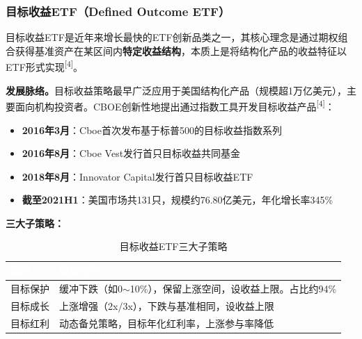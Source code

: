 \documentclass[10pt,a4paper,twocolumn]{ctexart}
\begin{document}
\subsubsection{目标收益ETF（Defined Outcome ETF）}

目标收益ETF是近年来增长最快的ETF创新品类之一，其核心理念是通过期权组合获得基准资产在某区间内\textbf{特定收益结构}，本质上是将结构化产品的收益特征以ETF形式实现\textsuperscript{[4]}。

\textbf{发展脉络。}目标收益策略最早广泛应用于美国结构化产品（规模超1万亿美元），主要面向机构投资者。CBOE创新性地提出通过指数工具开发目标收益产品\textsuperscript{[4]}：

\begin{itemize}
\item \textbf{2016年3月}：Cboe首次发布基于标普500的目标收益指数系列
\item \textbf{2016年8月}：Cboe Vest发行首只目标收益共同基金
\item \textbf{2018年8月}：Innovator Capital发行首只目标收益ETF
\item \textbf{截至2021H1}：美国市场共131只，规模约76.80亿美元，年化增长率345\%
\end{itemize}

\textbf{三大子策略：}

\begin{table}[H]
\centering\footnotesize
\caption{目标收益ETF三大子策略}
\renewcommand{\arraystretch}{1.3}
\begin{tabularx}{\columnwidth}{@{}L{1.5cm} L{5.5cm}@{}}
\toprule
{}\textcolor{white}{\textbf{策略}} & \textcolor{white}{\textbf{收益结构}} \\
\midrule
目标保护 & 缓冲下跌（如0$\sim$10\%），保留上涨空间，设收益上限。占比约94\% \\
目标成长 & 上涨增强（2x/3x），下跌与基准相同，设收益上限 \\
目标红利 & 动态备兑策略，目标年化红利率，上涨参与率降低 \\
\bottomrule
\end{tabularx}
\end{table}
\end{document}
